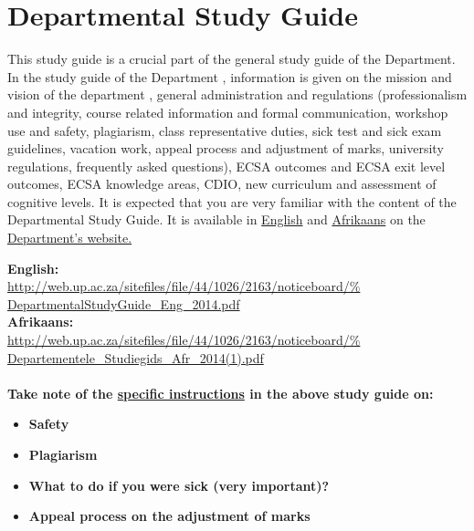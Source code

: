 \section{Departmental Study Guide} \label{sec:dep_study_guide}
    This study guide is a crucial part of the general study guide of the
    Department. In the study guide of the Department , information is given
    on the mission and vision of the department , general administration and
    regulations (professionalism and integrity, course related information
    and formal communication, workshop use and safety, plagiarism, class
    representative duties, sick test and sick exam guidelines, vacation work,
    appeal process and adjustment of marks, university regulations, frequently
    asked questions), ECSA outcomes and ECSA exit level outcomes, ECSA
    knowledge areas, CDIO, new curriculum and assessment of cognitive levels.
    It is expected that you are very familiar with the content of the
    Departmental Study Guide. It is available in
    \href{http://web.up.ac.za/sitefiles/file/44/1026/2163/noticeboard/%
        DepartmentalStudyGuide\_Eng\_2014.pdf}{English}
    and
    \href{http://web.up.ac.za/sitefiles/file/44/1026/2163/noticeboard/%
        Departementele\_Studiegids\_Afr\_2014(1).pdf}{Afrikaans}
    on the
    \href{http://web.up.ac.za/default.asp?ipkCategoryID=11426&%
        subid=11426&ipklookid=7}{Department’s website.}

    \noindent
    \textbf{English:} \\
    \url{http://web.up.ac.za/sitefiles/file/44/1026/2163/noticeboard/%
        DepartmentalStudyGuide\_Eng\_2014.pdf} \\
    \textbf{Afrikaans:} \\
    \url{http://web.up.ac.za/sitefiles/file/44/1026/2163/noticeboard/%
        Departementele\_Studiegids\_Afr\_2014(1).pdf} \\~\\

    \noindent
    \textbf{Take note of the \uline{specific instructions} in the above study guide on:}
    \begin{itemize}
        \item \textbf{Safety}
        \item \textbf{Plagiarism}
        \item \textbf{What to do if you were sick (very important)?}
        \item \textbf{Appeal process on the adjustment of marks}
    \end{itemize}
